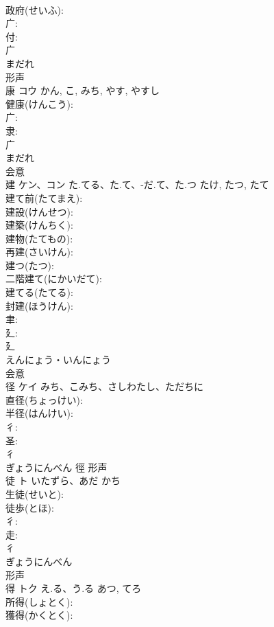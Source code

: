 \documentclass[8pt]{extreport}
\begin{document}
\begin{CJK}{UTF8}{min}
\\	政府(せいふ): 
\\	广: 
\\	付: 
\\	广	
\\	まだれ	
\\	形声 
\\	康	コウ		かん, こ, みち, やす, やすし	
\\	健康(けんこう): 
\\	广: 
\\	隶: 
\\	广	
\\	まだれ	
\\	会意 
\\	建	ケン、コン	た.てる、た.て、-だ.て、た.つ	たけ, たつ, たて	
\\	建て前(たてまえ): 
\\	建設(けんせつ): 
\\	建築(けんちく): 
\\	建物(たてもの): 
\\	再建(さいけん): 
\\	建つ(たつ): 
\\	二階建て(にかいだて): 
\\	建てる(たてる): 
\\	封建(ほうけん): 
\\	聿: 
\\	廴: 
\\	廴	
\\	えんにょう・いんにょう	
\\	会意 
\\	径	ケイ	みち、こみち、さしわたし、ただちに		
\\	直径(ちょっけい): 
\\	半径(はんけい): 
\\	彳: 
\\	圣: 
\\	彳	
\\	ぎょうにんべん	徑	形声 
\\	徒	ト	いたずら、あだ	かち	
\\	生徒(せいと): 
\\	徒歩(とほ): 
\\	彳: 
\\	走: 
\\	彳	
\\	ぎょうにんべん	
\\	形声 
\\	得	トク	え.る、う.る	あつ, てろ	
\\	所得(しょとく): 
\\	獲得(かくとく): 

\end{CJK}
\end{document}
